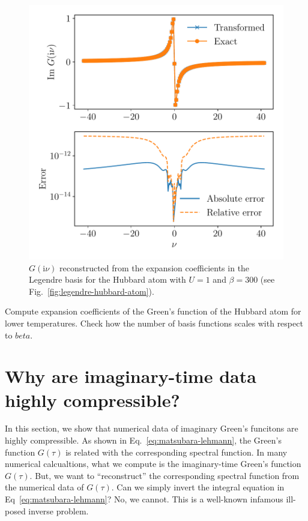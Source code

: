 \documentclass[submission, LectureNotes]{SciPost}
\newcommand\ii{\mathrm{i}}%
\newcommand\iv{\ii\nu}%
\begin{document}
\begin{figure}
    \centering
    \includegraphics[width=0.8\columnwidth]{legendre_matsu_hubbard_atom.pdf}
    \caption{
        $G(\iv)$ reconstructed from the expansion coefficients in the Legendre basis
        for the Hubbard atom with $U=1$ and $\beta=300$ (see Fig.~\ref{fig:legendre-hubbard-atom}).
        }
    \label{fig:legendre-matsu-hubbard-atom}
\end{figure}


\begin{Exercise}
    Compute expansion coefficients of the Green's function of the Hubbard atom
    for lower temperatures.
    Check how the number of basis functions scales with respect to $beta$.
\end{Exercise}



\section{Why are imaginary-time data highly compressible?}
In this section, we show that numerical data of imaginary Green's funcitons are highly compressible.
As shown in Eq.~\eqref{eq:matsubara-lehmann},
the Green's function $G(\tau)$ is related with the corresponding spectral function.
In many numerical calcualtions, what we compute is the imaginary-time Green's function $G(\tau)$.
But, we want to ``reconstruct'' the corresponding spectral function from the numerical data of $G(\tau)$.
Can we simply invert the integral equation in Eq~\eqref{eq:matsubara-lehmann}?
No, we cannot.
This is a well-known infamous ill-posed inverse problem.
\end{document}
